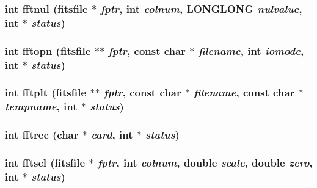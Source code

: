 \subsubsection{\setlength{\rightskip}{0pt plus 5cm}int fftnul (\bf{fitsfile} $\ast$ {\em fptr}, int {\em colnum}, \bf{LONGLONG} {\em nulvalue}, int $\ast$ {\em status})}\label{test_2shm__client_2fitsio_8h_813d7e81005862e106faec7f89bf7d6e}


\subsubsection{\setlength{\rightskip}{0pt plus 5cm}int fftopn (\bf{fitsfile} $\ast$$\ast$ {\em fptr}, const char $\ast$ {\em filename}, int {\em iomode}, int $\ast$ {\em status})}\label{test_2shm__client_2fitsio_8h_043bb8b9d000367a0944ddb91a391176}


\subsubsection{\setlength{\rightskip}{0pt plus 5cm}int fftplt (\bf{fitsfile} $\ast$$\ast$ {\em fptr}, const char $\ast$ {\em filename}, const char $\ast$ {\em tempname}, int $\ast$ {\em status})}\label{test_2shm__client_2fitsio_8h_d6eb6624c7f8a5f97f9128969f307cd8}


\subsubsection{\setlength{\rightskip}{0pt plus 5cm}int fftrec (char $\ast$ {\em card}, int $\ast$ {\em status})}\label{test_2shm__client_2fitsio_8h_790ab8b814352c996191e4eed875c843}


\subsubsection{\setlength{\rightskip}{0pt plus 5cm}int fftscl (\bf{fitsfile} $\ast$ {\em fptr}, int {\em colnum}, double {\em scale}, double {\em zero}, int $\ast$ {\em status})}\label{test_2shm__client_2fitsio_8h_189576cb1cc68cb3339679ea81efa79e}


